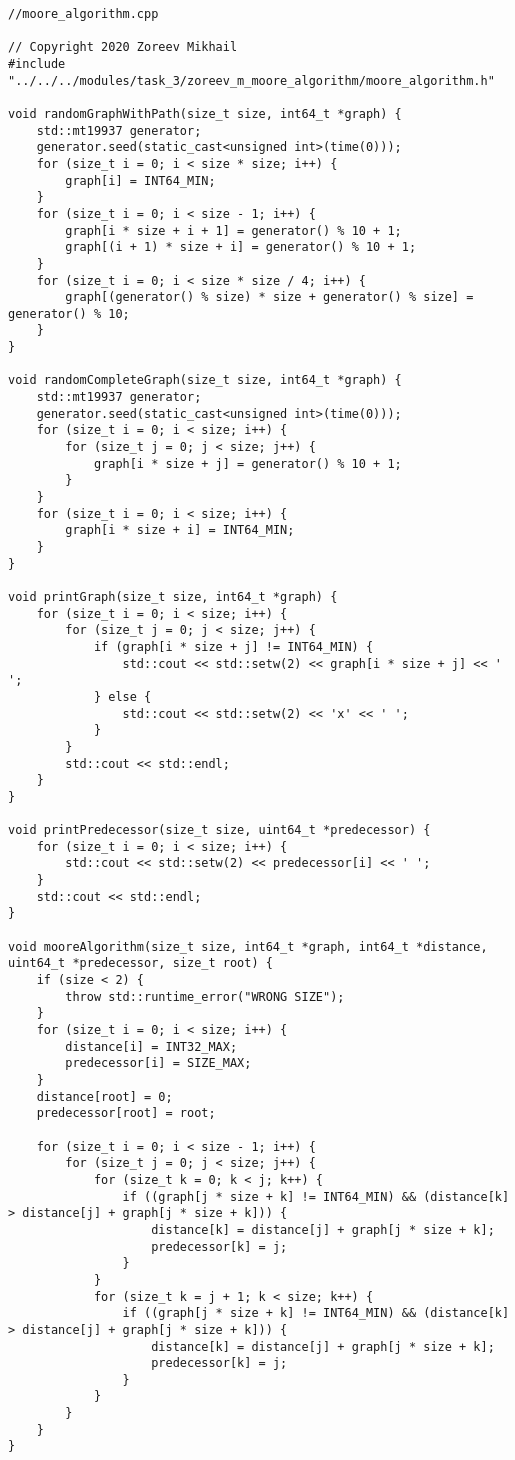 \documentclass{report}
\begin{document}
\begin{lstlisting}
//moore_algorithm.cpp

// Copyright 2020 Zoreev Mikhail
#include "../../../modules/task_3/zoreev_m_moore_algorithm/moore_algorithm.h"

void randomGraphWithPath(size_t size, int64_t *graph) {
    std::mt19937 generator;
    generator.seed(static_cast<unsigned int>(time(0)));
    for (size_t i = 0; i < size * size; i++) {
        graph[i] = INT64_MIN;
    }
    for (size_t i = 0; i < size - 1; i++) {
        graph[i * size + i + 1] = generator() % 10 + 1;
        graph[(i + 1) * size + i] = generator() % 10 + 1;
    }
    for (size_t i = 0; i < size * size / 4; i++) {
        graph[(generator() % size) * size + generator() % size] = generator() % 10;
    }
}

void randomCompleteGraph(size_t size, int64_t *graph) {
    std::mt19937 generator;
    generator.seed(static_cast<unsigned int>(time(0)));
    for (size_t i = 0; i < size; i++) {
        for (size_t j = 0; j < size; j++) {
            graph[i * size + j] = generator() % 10 + 1;
        }
    }
    for (size_t i = 0; i < size; i++) {
        graph[i * size + i] = INT64_MIN;
    }
}

void printGraph(size_t size, int64_t *graph) {
    for (size_t i = 0; i < size; i++) {
        for (size_t j = 0; j < size; j++) {
            if (graph[i * size + j] != INT64_MIN) {
                std::cout << std::setw(2) << graph[i * size + j] << ' ';
            } else {
                std::cout << std::setw(2) << 'x' << ' ';
            }
        }
        std::cout << std::endl;
    }
}

void printPredecessor(size_t size, uint64_t *predecessor) {
    for (size_t i = 0; i < size; i++) {
        std::cout << std::setw(2) << predecessor[i] << ' ';
    }
    std::cout << std::endl;
}

void mooreAlgorithm(size_t size, int64_t *graph, int64_t *distance, uint64_t *predecessor, size_t root) {
    if (size < 2) {
        throw std::runtime_error("WRONG SIZE");
    }
    for (size_t i = 0; i < size; i++) {
        distance[i] = INT32_MAX;
        predecessor[i] = SIZE_MAX;
    }
    distance[root] = 0;
    predecessor[root] = root;

    for (size_t i = 0; i < size - 1; i++) {
        for (size_t j = 0; j < size; j++) {
            for (size_t k = 0; k < j; k++) {
                if ((graph[j * size + k] != INT64_MIN) && (distance[k] > distance[j] + graph[j * size + k])) {
                    distance[k] = distance[j] + graph[j * size + k];
                    predecessor[k] = j;
                }
            }
            for (size_t k = j + 1; k < size; k++) {
                if ((graph[j * size + k] != INT64_MIN) && (distance[k] > distance[j] + graph[j * size + k])) {
                    distance[k] = distance[j] + graph[j * size + k];
                    predecessor[k] = j;
                }
            }
        }
    }
}


\end{lstlisting}
\end{document}
